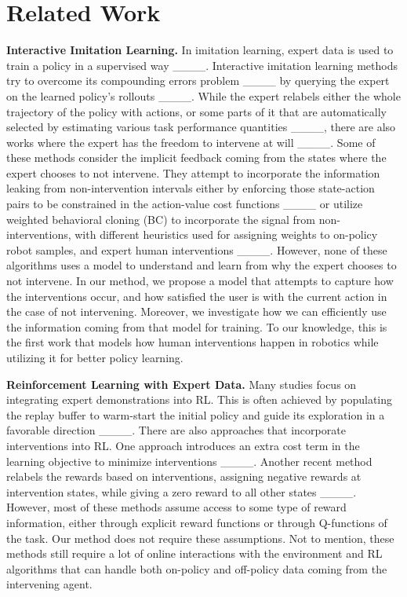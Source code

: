 \section{Related Work}
\label{sec:related_work}
    \textbf{Interactive Imitation Learning.} In imitation learning, expert data is used to train a policy in a supervised way ____. Interactive imitation learning methods try to overcome its compounding errors problem ____ by querying the expert on the learned policy's rollouts ____. While the expert relabels either the whole trajectory of the policy with actions, or some parts of it that are automatically selected by estimating various task performance quantities ____, there are also works where the expert has the freedom to intervene at will ____. Some of these methods consider the implicit feedback coming from the states where the expert chooses to not intervene. They attempt to incorporate the information leaking from non-intervention intervals either by enforcing those state-action pairs to be constrained in the action-value cost functions ____ or utilize weighted behavioral cloning (BC) to incorporate the signal from non-interventions, with different heuristics used for assigning weights to on-policy robot samples, and expert human interventions ____.
    However, none of these algorithms uses a model to understand and learn from why the expert chooses to not intervene. In our method, we propose a model that attempts to capture how the interventions occur, and how satisfied the user is with the current action in the case of not intervening. Moreover, we investigate how we can efficiently use the information coming from that model for training. To our knowledge, this is the first work that models how human interventions happen in robotics while utilizing it for better policy learning.

    \noindent\textbf{Reinforcement Learning with Expert Data.} Many studies focus on integrating expert demonstrations into RL. This is often achieved by populating the replay buffer to warm-start the initial policy and guide its exploration in a favorable direction ____. There are also approaches that incorporate interventions into RL. One approach introduces an extra cost term in the learning objective to minimize interventions ____. Another recent method relabels the rewards based on interventions, assigning negative rewards at intervention states, while giving a zero reward to all other states ____. However, most of these methods assume access to some type of reward information, either through explicit reward functions or through Q-functions of the task. Our method does not require these assumptions. Not to mention, these methods still require a lot of online interactions with the environment and RL algorithms that can handle both on-policy and off-policy data coming from the intervening agent.

